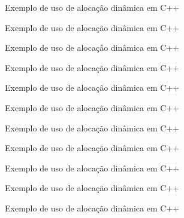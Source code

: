 \begin{frame}[fragile]{Exemplo de uso de alocação dinâmica em C++}
\end{frame}

\begin{frame}[fragile]{Exemplo de uso de alocação dinâmica em C++}
\end{frame}

\begin{frame}[fragile]{Exemplo de uso de alocação dinâmica em C++}
\end{frame}

\begin{frame}[fragile]{Exemplo de uso de alocação dinâmica em C++}
\end{frame}

\begin{frame}[fragile]{Exemplo de uso de alocação dinâmica em C++}
\end{frame}

\begin{frame}[fragile]{Exemplo de uso de alocação dinâmica em C++}
\end{frame}

\begin{frame}[fragile]{Exemplo de uso de alocação dinâmica em C++}
\end{frame}

\begin{frame}[fragile]{Exemplo de uso de alocação dinâmica em C++}
\end{frame}

\begin{frame}[fragile]{Exemplo de uso de alocação dinâmica em C++}
\end{frame}

\begin{frame}[fragile]{Exemplo de uso de alocação dinâmica em C++}
\end{frame}

\begin{frame}[fragile]{Exemplo de uso de alocação dinâmica em C++}
\end{frame}
